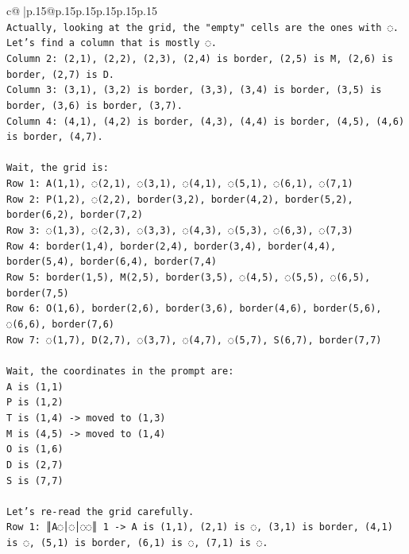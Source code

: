 \documentclass{article}
\begin{document}
{\begin{supertabular}{c@{$\;$}|p{.15\linewidth}@{}p{.15\linewidth}p{.15\linewidth}p{.15\linewidth}p{.15\linewidth}p{.15\linewidth}}
{{{\\ 
\texttt{Actually, looking at the grid, the "empty" cells are the ones with ◌.} \\
\texttt{Let's find a column that is mostly ◌.} \\
\texttt{Column 2: (2,1), (2,2), (2,3), (2,4) is border, (2,5) is M, (2,6) is border, (2,7) is D.} \\
\texttt{Column 3: (3,1), (3,2) is border, (3,3), (3,4) is border, (3,5) is border, (3,6) is border, (3,7).} \\
\texttt{Column 4: (4,1), (4,2) is border, (4,3), (4,4) is border, (4,5), (4,6) is border, (4,7).} \\
\\ 
\texttt{Wait, the grid is:} \\
\texttt{Row 1: A(1,1), ◌(2,1), ◌(3,1), ◌(4,1), ◌(5,1), ◌(6,1), ◌(7,1)} \\
\texttt{Row 2: P(1,2), ◌(2,2), border(3,2), border(4,2), border(5,2), border(6,2), border(7,2)} \\
\texttt{Row 3: ◌(1,3), ◌(2,3), ◌(3,3), ◌(4,3), ◌(5,3), ◌(6,3), ◌(7,3)} \\
\texttt{Row 4: border(1,4), border(2,4), border(3,4), border(4,4), border(5,4), border(6,4), border(7,4)} \\
\texttt{Row 5: border(1,5), M(2,5), border(3,5), ◌(4,5), ◌(5,5), ◌(6,5), border(7,5)} \\
\texttt{Row 6: O(1,6), border(2,6), border(3,6), border(4,6), border(5,6), ◌(6,6), border(7,6)} \\
\texttt{Row 7: ◌(1,7), D(2,7), ◌(3,7), ◌(4,7), ◌(5,7), S(6,7), border(7,7)} \\
\\ 
\texttt{Wait, the coordinates in the prompt are:} \\
\texttt{A is (1,1)} \\
\texttt{P is (1,2)} \\
\texttt{T is (1,4) {-}> moved to (1,3)} \\
\texttt{M is (4,5) {-}> moved to (1,4)} \\
\texttt{O is (1,6)} \\
\texttt{D is (2,7)} \\
\texttt{S is (7,7)} \\
\\ 
\texttt{Let's re{-}read the grid carefully.} \\
\texttt{Row 1: ║A◌│◌│◌◌║ 1 {-}> A is (1,1), (2,1) is ◌, (3,1) is border, (4,1) is ◌, (5,1) is border, (6,1) is ◌, (7,1) is ◌.} \\
}}}
\end{supertabular}}
\end{document}
